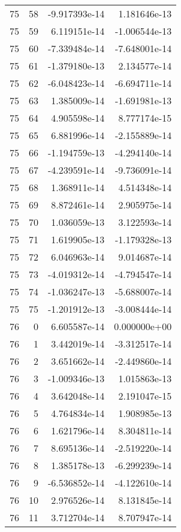 \begin{tabular}{rrrr}
  75 &   58 & -9.917393e-14 &  1.181646e-13 \\
  75 &   59 &  6.119151e-14 & -1.006544e-13 \\
  75 &   60 & -7.339484e-14 & -7.648001e-14 \\
  75 &   61 & -1.379180e-13 &  2.134577e-14 \\
  75 &   62 & -6.048423e-14 & -6.694711e-14 \\
  75 &   63 &  1.385009e-14 & -1.691981e-13 \\
  75 &   64 &  4.905598e-14 &  8.777174e-15 \\
  75 &   65 &  6.881996e-14 & -2.155889e-14 \\
  75 &   66 & -1.194759e-13 & -4.294140e-14 \\
  75 &   67 & -4.239591e-14 & -9.736091e-14 \\
  75 &   68 &  1.368911e-14 &  4.514348e-14 \\
  75 &   69 &  8.872461e-14 &  2.905975e-14 \\
  75 &   70 &  1.036059e-13 &  3.122593e-14 \\
  75 &   71 &  1.619905e-13 & -1.179328e-13 \\
  75 &   72 &  6.046963e-14 &  9.014687e-14 \\
  75 &   73 & -4.019312e-14 & -4.794547e-14 \\
  75 &   74 & -1.036247e-13 & -5.688007e-14 \\
  75 &   75 & -1.201912e-13 & -3.008444e-14 \\
  76 &    0 &  6.605587e-14 &  0.000000e+00 \\
  76 &    1 &  3.442019e-14 & -3.312517e-14 \\
  76 &    2 &  3.651662e-14 & -2.449860e-14 \\
  76 &    3 & -1.009346e-13 &  1.015863e-13 \\
  76 &    4 &  3.642048e-14 &  2.191047e-15 \\
  76 &    5 &  4.764834e-14 &  1.908985e-13 \\
  76 &    6 &  1.621796e-14 &  8.304811e-14 \\
  76 &    7 &  8.695136e-14 & -2.519220e-14 \\
  76 &    8 &  1.385178e-13 & -6.299239e-14 \\
  76 &    9 & -6.536852e-14 & -4.122610e-14 \\
  76 &   10 &  2.976526e-14 &  8.131845e-14 \\
  76 &   11 &  3.712704e-14 &  8.707947e-14 \\

\end{tabular}
